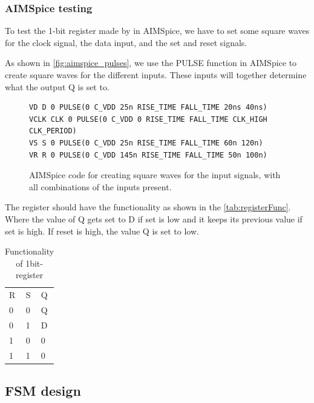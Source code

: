 \subsubsection{AIMSpice testing}
\label{subsubsec:aimspice_testing}
To test the 1-bit register made by in AIMSpice, we have to set some square waves for the clock signal, the data input, and the set and reset signals.

As shown in \autoref{fig:aimspice_pulses}, we use the PULSE function in AIMSpice to create square waves for the different inputs. These inputs will together determine what the output Q is set to.

\begin{figure}[H]
\centering
\label{fig:aimspice_pulses}
\begin{minipage}{0.9\textwidth}
\begin{lstlisting}[style=aimspiceStyle]
VD D 0 PULSE(0 C_VDD 25n RISE_TIME FALL_TIME 20ns 40ns)
VCLK CLK 0 PULSE(0 C_VDD 0 RISE_TIME FALL_TIME CLK_HIGH CLK_PERIOD)
VS S 0 PULSE(0 C_VDD 25n RISE_TIME FALL_TIME 60n 120n)
VR R 0 PULSE(0 C_VDD 145n RISE_TIME FALL_TIME 50n 100n)
\end{lstlisting}
\end{minipage}
\caption{AIMSpice code for creating square waves for the input signals, with all combinations of the inputs present.}
\end{figure}

The register should have the functionality as shown in the \autoref{tab:registerFunc}. Where the value of Q gets set to D if set is low and it keeps its previous value if set is high. If reset is high, the value Q is set to low. 

\begin{table}[H]
\label{tab:registerFunc}
\centering
\caption{Functionality of 1bit-register}
\begin{tabular}{|l|l|l|}
\cline{1-3}
\rowcolor[HTML]{C0C0C0} 
R & S & Q  \\ \cline{1-3}
0 & 0 & Q  \\ \cline{1-3}
0 & 1 & D  \\ \cline{1-3}
1 & 0 & 0  \\ \cline{1-3}
1 & 1 & 0  \\ \cline{1-3}
\end{tabular}
\end{table}

\subsection{FSM design}

